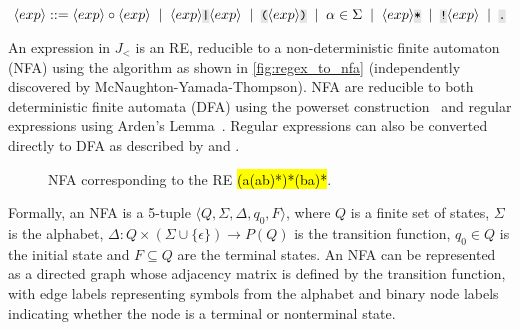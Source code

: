 \documentclass{article}
\newcommand*{\tinline}[1]{{\sethlcolor{slightgray}\ttfamily\footnotesize\relax\hl{#1}}}
\begin{document}
\begin{equation}\label{eq:grammar}
    \bnfrl{exp} ::= \bnfrl{exp}\circ\bnfrl{exp} \mor \bnfrl{exp}\code{|}\bnfrl{exp} \mor \code{(}\bnfrl{exp}\code{)} \mor \alpha \in \Sigma \mor \bnfrl{exp}\code{*} \mor \code{!}\bnfrl{exp} \mor \code{.}
\end{equation}

An expression in $J_<$ is an RE, reducible to a non-deterministic finite automaton (NFA) using the \citet{glushkov1961abstract} algorithm as shown in \autoref{fig:regex_to_nfa} (independently discovered by McNaughton-Yamada-Thompson). NFA are reducible to both deterministic finite automata (DFA) using the powerset construction~\citep{rabin1959finite} and regular expressions using Arden's Lemma~\citep{arden1961delayed}. Regular expressions can also be converted directly to DFA as described by \citet{brzozowski1964derivatives} and \citet{berry1986regular}.

\begin{figure}
    \caption{NFA corresponding to the RE \tinline{(a(ab)*)*(ba)*}.}
    \label{fig:regex_to_nfa}
\end{figure}

Formally, an NFA is a 5-tuple $\langle Q, \Sigma, \Delta, q_0, F \rangle$, where $Q$ is a finite set of states, $\Sigma$ is the alphabet, $\Delta :Q\times (\Sigma \cup \{\epsilon \})\rightarrow P(Q)$ is the transition function, $q_0 \in Q$ is the initial state and $F \subseteq Q$ are the terminal states. An NFA can be represented as a directed graph whose adjacency matrix is defined by the transition function, with edge labels representing symbols from the alphabet and binary node labels indicating whether the node is a terminal or nonterminal state.
\end{document}
